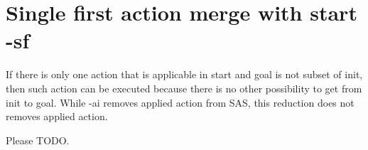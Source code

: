 \chapter{Single first action merge with start -sf}
	
If there is only one action that is applicable in start and goal is not subset of init, then such action can be executed because there is no other possibility to get from init to goal. While -ai removes applied action from SAS, this reduction does not removes applied action. 

Please TODO.